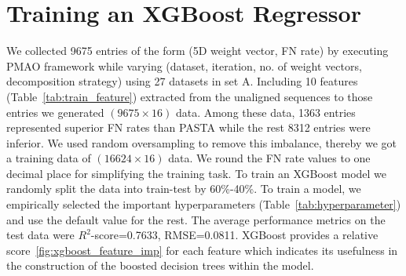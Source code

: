 \appendix
\section{Training an XGBoost Regressor} \label{appendix:train_xgboost}
We collected 9675 entries of the form (5D weight vector, FN rate) by executing PMAO framework while varying (dataset, iteration, no. of weight vectors, decomposition strategy) using 27 datasets in set A. Including 10 features (Table~\ref{tab:train_feature}) extracted from the unaligned sequences to those entries we generated $(9675 \times 16)$ data. Among these data, 1363 entries represented superior FN rates than PASTA while the rest 8312 entries were inferior. We used random oversampling to remove this imbalance, thereby we got a training data of $(16624 \times 16)$ data. We round the FN rate values to one decimal place for simplifying the training task. To train an XGBoost model we randomly split the data into train-test by 60\%-40\%. To train a model, we empirically selected the important hyperparameters (Table~\ref{tab:hyperparameter}) and use the default value for the rest. The average performance metrics on the test data were $R^2$-score=0.7633, RMSE=0.0811. XGBoost provides a relative score~\ref{fig:xgboost_feature_imp} for each feature which
indicates its usefulness in the construction
of the boosted decision trees within the model.



